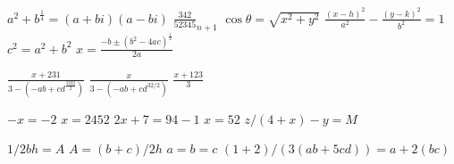 \documentclass{article}
\begin{document}
$ a^2+b^{\frac{1}{4}} = (a+bi)(a-bi) $
$ \frac{342}{52345}_{n+1} $
$ \cos\theta = \sqrt{x^2 + y^2} $
$ \frac{(x-h)^2}{a^2} - \frac{(y-k)^2}{b^2} = 1 $
$ c^2 = a^2 + b^2 $
$ x = \frac{-b\pm(b^2-4ac)^{\frac{1}{2}}}{2a} $

$ \frac{x+231}{3-(-ab + cd^\frac{3222}{2})} $
$ \frac{x}{3-(-ab + cd^{32/2})} $
$ \frac{x+123}{3} $

$ -x = -2 $
$ x=2452 $ 
$ 2x + 7 = 94 - 1 $ 
$ x = 52 $ 
$ z/(4 + x) - y = M $

$ 1/2bh = A $
$ A = (b+c)/2h $
$ a=b=c $
$ (1+2)/(3(ab+5cd))=a+2(bc) $
\end{document}
